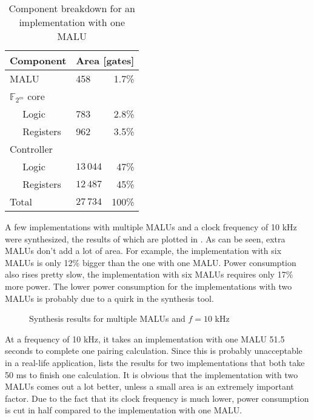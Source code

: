\begin{table}[h]
	\caption{Component breakdown for an implementation with one MALU}
	\label{table-breakdown}
	\centering
	\begin{tabular}{llr}
		\toprule
		Component					& \multicolumn{2}{c}{Area [gates]}\\
		\midrule
		MALU				 			& 458			& 1.7\%\\
		$\mathbb{F}_{2^m}$ core	&				& \\
		$\quad$ Logic				& 783			& 2.8\%\\
		$\quad$ Registers			& 962			& 3.5\%\\
		Controller					&				& \\
		$\quad$ Logic				& $13\,044$	& 47\%\\
		$\quad$ Registers			& $12\,487$	& 45\%\\
		\midrule
		Total							& $27\,734$	& 100\%\\
		\bottomrule		
	\end{tabular}
\end{table}

A few implementations with multiple MALUs and a clock frequency of 10 kHz were synthesized, the results of which are plotted in . As can be seen, extra MALUs don't add a lot of area. For example, the implementation with six MALUs is only 12\% bigger than the one with one MALU. Power consumption also rises pretty slow, the implementation with six MALUs requires only 17\% more power. The lower power consumption for the implementations with two MALUs is probably due to a quirk in the synthesis tool.

\begin{figure}[h]
	\centering
		\caption{Synthesis results for multiple MALUs and $f = 10$ kHz\label{figure-mult-malu}}
\end{figure}

At a frequency of 10 kHz, it takes an implementation with one MALU 51.5 seconds to complete one pairing calculation. Since this is probably unacceptable in a real-life application,  lists the results for two implementations that both take 50 ms to finish one calculation. It is obvious that the implementation with two MALUs comes out a lot better, unless a small area is an extremely important factor. Due to the fact that its clock frequency is much lower, power consumption is cut in half compared to the implementation with one MALU.

